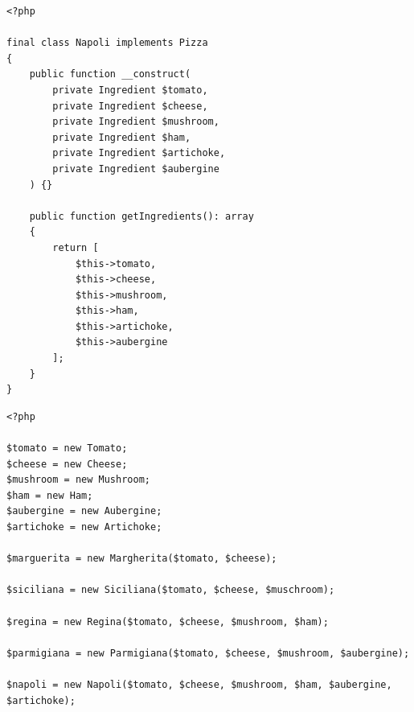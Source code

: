 \begin{frame}[fragile,c]
    \begin{lstlisting}
<?php

final class Napoli implements Pizza
{
    public function __construct(
        private Ingredient $tomato,
        private Ingredient $cheese,
        private Ingredient $mushroom,
        private Ingredient $ham,
        private Ingredient $artichoke,
        private Ingredient $aubergine
    ) {}

    public function getIngredients(): array
    {
        return [
            $this->tomato,
            $this->cheese,
            $this->mushroom,
            $this->ham,
            $this->artichoke,
            $this->aubergine
        ];
    }
}
    \end{lstlisting}
\end{frame}

\begin{frame}[fragile,c]
    \begin{lstlisting}
<?php

$tomato = new Tomato;
$cheese = new Cheese;
$mushroom = new Mushroom;
$ham = new Ham;
$aubergine = new Aubergine;
$artichoke = new Artichoke;

$marguerita = new Margherita($tomato, $cheese);

$siciliana = new Siciliana($tomato, $cheese, $muschroom);

$regina = new Regina($tomato, $cheese, $mushroom, $ham);

$parmigiana = new Parmigiana($tomato, $cheese, $mushroom, $aubergine);

$napoli = new Napoli($tomato, $cheese, $mushroom, $ham, $aubergine, $artichoke);
    \end{lstlisting}
\end{frame}

